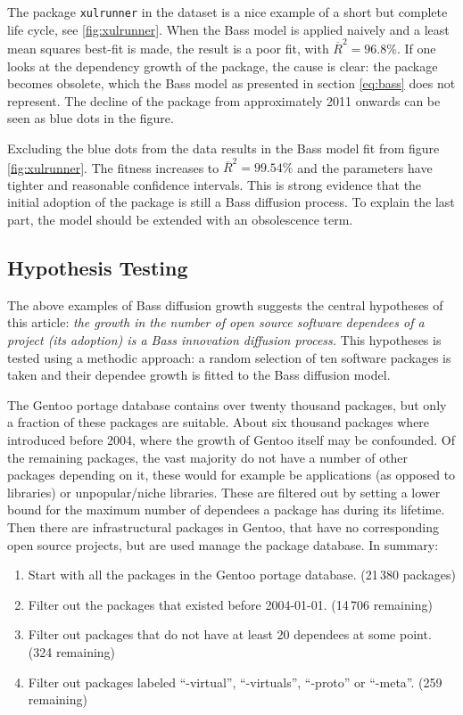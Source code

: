 \documentclass[smallextended,final]{svjour3}
\begin{document}
The package \verb|xulrunner| in the dataset is a nice example of a short but complete life cycle, see \ref{fig:xulrunner}. When the Bass model is applied naively and a least mean squares best-fit is made, the result is a poor fit, with $\overline{R}^2 = 96.8\%$. If one looks at the dependency growth of the package, the cause is clear: the package becomes obsolete, which the Bass model as presented in section \ref{eq:bass} does not represent. The decline of the package from approximately 2011 onwards can be seen as blue dots in the figure.

Excluding the blue dots from the data results in the Bass model fit from figure \ref{fig:xulrunner}. The fitness increases to $\overline{R}^2 = 99.54\%$ and the parameters have tighter and reasonable confidence intervals. This is strong evidence that the initial adoption of the package is still a Bass diffusion process. To explain the last part, the model should be extended with an obsolescence term.

\subsection{Hypothesis Testing}

The above examples of Bass diffusion growth suggests the central hypotheses of this article: \emph{the growth in the number of open source software dependees of a project (its adoption) is a Bass innovation diffusion process.} This hypotheses is tested using a methodic approach: a random selection of ten software packages is taken and their dependee growth is fitted to the Bass diffusion model.

The Gentoo portage database contains over twenty thousand packages, but only a fraction of these packages are suitable. About six thousand packages where introduced before 2004, where the growth of Gentoo itself may be confounded. Of the remaining packages, the vast majority do not have a number of other packages depending on it, these would for example be applications (as opposed to libraries) or unpopular/niche libraries. These are filtered out by setting a lower bound for the maximum number of dependees a package has during its lifetime. Then there are infrastructural packages in Gentoo, that have no corresponding open source projects, but are used manage the package database. In summary:

\begin{enumerate}
	\item Start with all the packages in the Gentoo portage database. (21\,380 packages)
	\item Filter out the packages that existed before 2004-01-01. (14\,706 remaining)
	\item Filter out packages that do not have at least 20 dependees at some point. (324 remaining)
	\item Filter out packages labeled ``-virtual'', ``-virtuals'', ``-proto'' or ``-meta''. (259 remaining)
\end{enumerate}
\end{document}
